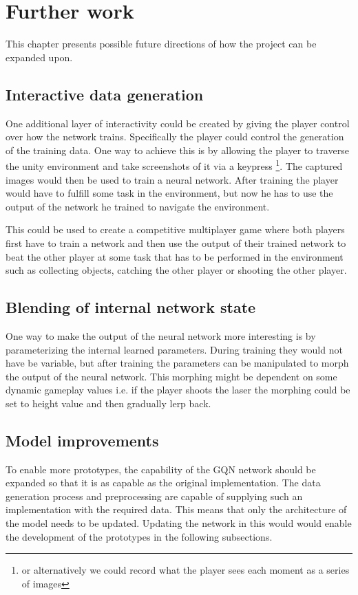
\chapter{Further work}\label{FurtherWork}
This chapter presents possible future directions of how the project can be expanded upon.


\section{Interactive data generation}
One additional layer of interactivity could be created by giving the player control over how the network trains. Specifically the player could control the generation of the training data. One way to achieve this is by allowing the player to traverse the unity environment and take screenshots of it via a keypress \footnote{or alternatively we could record what the player sees each moment as a series of images}. The captured images would then be used to train a neural network. After training the player would have to fulfill some task in the environment, but now he has to use the output of the network he trained to navigate the environment.

This could be used to create a competitive multiplayer game where both players first have to train a network and then use the output of their trained network to beat the other player at some task that has to be performed in the environment such as collecting objects, catching the other player or shooting the other player.


\section{Blending of internal network state}
One way to make the output of the neural network more interesting is by parameterizing the internal learned parameters. During training they would not have be variable, but after training the parameters can be manipulated to morph the output of the neural network. This morphing might be dependent on some dynamic gameplay values i.e. if the player shoots the laser the morphing could be set to height value and then gradually lerp back.


\section{Model improvements}
To enable more prototypes, the capability of the GQN network should be expanded so that it is as capable as the original implementation. The data generation process and preprocessing are capable of supplying such an implementation with the required data. This means that only the architecture of the model needs to be updated. Updating the network in this would would enable the development of the prototypes in the following subsections.


